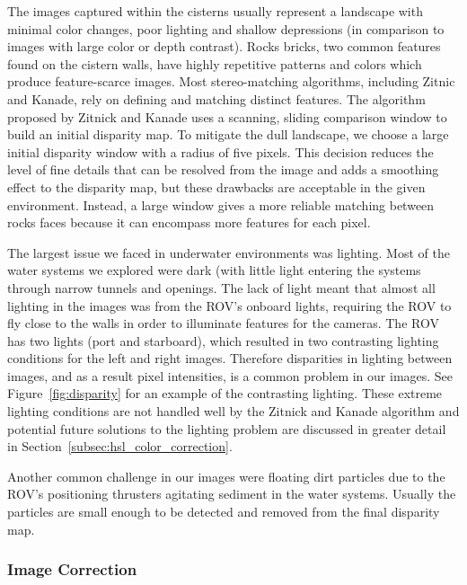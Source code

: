 \documentclass[a4paper,twoside]{article}
\begin{document}
The images captured within the cisterns usually represent a landscape with minimal color changes, poor lighting and shallow depressions (in comparison to images with large color or depth contrast).
Rocks bricks, two common features found on the cistern walls, have highly repetitive patterns and colors which produce feature-scarce images.
Most stereo-matching algorithms, including Zitnic and Kanade, rely on defining and matching distinct features.
The algorithm proposed by Zitnick and Kanade uses a scanning, sliding comparison window to build an initial disparity map.
To mitigate the dull landscape, we choose a large initial disparity window with a radius of five pixels.
This decision reduces the level of fine details that can be resolved from the image and adds a smoothing effect to the disparity map, but these drawbacks are acceptable in the given environment.
Instead, a large window gives a more reliable matching between rocks faces because it can encompass more features for each pixel.  

The largest issue we faced in underwater environments was lighting. Most of the water systems we explored were dark (with little light entering the systems through narrow tunnels and openings. The lack of light meant that almost all lighting in the images was from the ROV's onboard lights, requiring the ROV to fly close to the walls in order to illuminate features for the cameras. The ROV has two lights (port and starboard), which resulted in two contrasting lighting conditions for the left and right images. Therefore disparities in lighting between images, and as a result pixel intensities, is a common problem in our images. See Figure~\ref{fig:disparity} for an example of the contrasting lighting. These extreme lighting conditions are not handled well by the Zitnick and Kanade algorithm and potential future solutions to the lighting problem are discussed in greater detail in Section~\ref{subsec:hsl_color_correction}.

Another common challenge in our images were floating dirt particles due to the ROV's positioning thrusters agitating sediment in the water systems. Usually the particles are small enough to be detected and removed from the final disparity map.


\subsubsection{Image Correction}
\label{subsec:image_correction}
\end{document}
